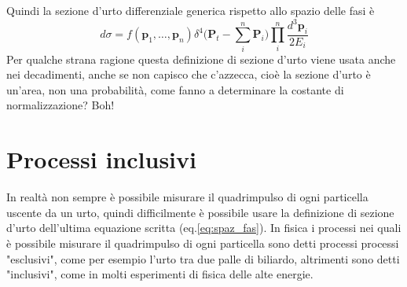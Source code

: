 \documentclass[11pt,a4paper]{article}
\newcommand{\vettore}[1]{\mathbf{#1}}
\begin{document}
		Quindi la sezione d'urto differenziale generica rispetto allo spazio delle fasi è
		\begin{equation}
			d\sigma=f(\vettore p_1,\dots,\vettore p_n)\delta^4\bigg(\vettore P_t-\sum_i^n \vettore P_i\bigg)\prod_i^n\frac{d^3\vettore p_i}{2E_i}
			\label{eq:spaz_fas}
		\end{equation} 
		Per qualche strana ragione questa definizione di sezione d'urto viene usata anche nei decadimenti, anche se non capisco che c'azzecca, cioè la sezione d'urto è un'area, non una probabilità, come fanno a determinare la costante di normalizzazione? Boh!


	\section{Processi inclusivi}
		In realtà non sempre è possibile misurare il quadrimpulso di ogni particella uscente da un urto, quindi difficilmente è possibile usare la definizione di sezione d'urto dell'ultima equazione scritta (eq.\ref{eq:spaz_fas}).\newline
		In fisica i processi nei quali è possibile misurare il quadrimpulso di ogni particella sono detti processi processi "esclusivi", come per esempio l'urto tra due palle di biliardo, altrimenti sono detti "inclusivi", come in molti esperimenti di fisica delle alte energie.\newline
\end{document}
